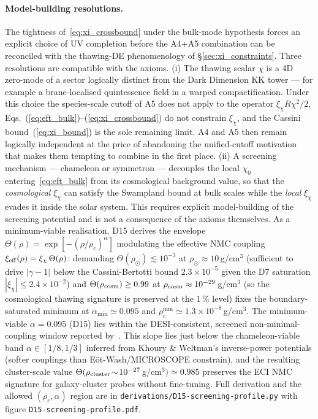 \documentclass[epjc3,twocolumn]{svjour3}
\begin{document}
\paragraph{Model-building resolutions.}
The tightness of~\eqref{eq:xi_crossbound} under the bulk-mode hypothesis
forces an explicit choice of UV completion before the A4+A5 combination
can be reconciled with the thawing-DE phenomenology of \S\ref{sec:xi_constraints}.
Three resolutions are compatible with the axioms.
(i) The thawing scalar $\chi$ is a 4D zero-mode of a sector logically
distinct from the Dark Dimension KK tower --- for example a brane-localised
quintessence field in a warped compactification. Under this choice the
species-scale cutoff of A5 does not apply to the operator $\xi_\chi R\chi^2/2$,
Eqs.~(\ref{eq:eft_bulk})--(\ref{eq:xi_crossbound}) do not constrain $\xi_\chi$,
and the Cassini bound~(\ref{eq:xi_bound}) is the sole remaining limit.
A4 and A5 then remain logically independent at the price of abandoning the
unified-cutoff motivation that makes them tempting to combine in the first place.
(ii) A screening mechanism --- chameleon or symmetron --- decouples the
local $\chi_0$ entering~\eqref{eq:eft_bulk} from its cosmological background
value, so that the \emph{cosmological} $\xi_\chi$ can satisfy the Swampland
bound at bulk scales while the \emph{local} $\xi_\chi$ evades it inside the
solar system. This requires explicit model-building of the screening
potential and is not a consequence of the axioms themselves.
As a minimum-viable realisation, D15 derives the envelope
$\Theta(\rho)=\exp[-(\rho/\rho_c)^{\alpha}]$ modulating the effective
NMC coupling $\xi_{\rm eff}(\rho)=\xi_\chi\,\Theta(\rho)$: demanding
$\Theta(\rho_\odot)\lesssim 10^{-3}$ at $\rho_\odot\approx 10\,$g/cm$^3$
(sufficient to drive $|\gamma-1|$ below the Cassini-Bertotti bound
$2.3\times 10^{-5}$ given the D7 saturation $|\xi_\chi|\le 2.4\times10^{-2}$)
and $\Theta(\rho_{\rm cosm})\ge 0.99$ at $\rho_{\rm cosm}\approx 10^{-29}\,$g/cm$^3$
(so the cosmological thawing signature is preserved at the $1\,\%$ level)
fixes the boundary-saturated minimum at $\alpha_{\min}\simeq 0.095$ and
$\rho_c^{\min}\simeq 1.3\times 10^{-8}\,$g/cm$^3$.
The minimum-viable $\alpha=0.095$ (D15) lies within the DESI-consistent,
screened non-minimal-coupling window reported by~\cite{AdamCline2025}.
This slope lies just
below the chameleon-viable band $\alpha\in[1/8,1/3]$ inferred from
Khoury \& Weltman's inverse-power potentials \cite{KhouryWeltman2004}
(softer couplings than Eöt-Wash/MICROSCOPE constrain), and the resulting
cluster-scale value $\Theta(\rho_{\rm cluster}\!\sim\!10^{-27}\,$g/cm$^3)\simeq 0.985$
preserves the ECI NMC signature for galaxy-cluster probes without
fine-tuning. Full derivation and the allowed $(\rho_c,\alpha)$ region
are in \texttt{derivations/D15-screening-profile.py} with figure
\texttt{D15-screening-profile.pdf}.
\end{document}
